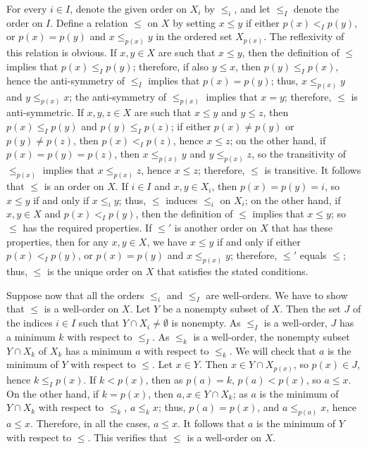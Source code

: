 \documentclass{article}
\begin{document}
\begin{solution}[\ref{exe:rw9lhmv9}]
  \label{sol:dcd6z7iz}
  For every \(i \in I\), denote the given order on \(X_i\) by
  \(\leq_i\), and let \(\leq_I\) denote the order on \(I\).  Define a
  relation \(\leq\) on \(X\) by setting \(x \leq y\) if either
  \(p(x) <_I p(y)\), or \(p(x) = p(y)\) and \(x \leq_{p(x)} y\) in the
  ordered set \(X_{p(x)}\).  The reflexivity of this relation is
  obvious.  If \(x, y \in X\) are such that \(x \leq y\), then the
  definition of \(\leq\) implies that \(p(x) \leq_I p(y)\); therefore,
  if also \(y \leq x\), then \(p(y) \leq_I p(x)\), hence the
  anti-symmetry of \(\leq_I\) implies that \(p(x) = p(y)\); thus,
  \(x \leq_{p(x)} y\) and \(y \leq_{p(x)} x\); the anti-symmetry of
  \(\leq_{p(x)}\) implies that \(x = y\); therefore, \(\leq\) is
  anti-symmetric.  If \(x, y, z \in X\) are such that \(x \leq y\) and
  \(y \leq z\), then \(p(x) \leq_I p(y)\) and \(p(y) \leq_I p(z)\); if
  either \(p(x) \neq p(y)\) or \(p(y) \neq p(z)\), then
  \(p(x) <_I p(z)\), hence \(x \leq z\); on the other hand, if
  \(p(x) = p(y) = p(z)\), then \(x \leq_{p(x)} y\) and
  \(y \leq_{p(x)} z\), so the transitivity of \(\leq_{p(x)}\) implies
  that \(x \leq_{p(x)} z\), hence \(x \leq z\); therefore, \(\leq\) is
  transitive.  It follows that \(\leq\) is an order on \(X\).  If
  \(i \in I\) and \(x, y \in X_i\), then \(p(x) = p(y) = i\), so
  \(x \leq y\) if and only if \(x \leq_i y\); thus, \(\leq\) induces
  \(\leq_i\) on \(X_i\); on the other hand, if \(x, y \in X\) and
  \(p(x) <_I p(y)\), then the definition of \(\leq\) implies that
  \(x \leq y\); so \(\leq\) has the required properties.  If \(\leq'\)
  is another order on \(X\) that has these properties, then for any
  \(x, y \in X\), we have \(x \leq y\) if and only if either
  \(p(x) <_I p(y)\), or \(p(x) = p(y)\) and \(x \leq_{p(x)} y\);
  therefore, \(\leq'\) equals \(\leq\); thus, \(\leq\) is the unique
  order on \(X\) that satisfies the stated conditions.

  Suppose now that all the orders \(\leq_i\) and \(\leq_I\) are
  well-orders.  We have to show that \(\leq\) is a well-order on
  \(X\).  Let \(Y\) be a nonempty subset of \(X\).  Then the set \(J\)
  of the indices \(i \in I\) such that \(Y \cap X_i \neq \emptyset\)
  is nonempty.  As \(\leq_I\) is a well-order, \(J\) has a minimum
  \(k\) with respect to \(\leq_I\).  As \(\leq_k\) is a well-order,
  the nonempty subset \(Y \cap X_k\) of \(X_k\) has a minimum \(a\)
  with respect to \(\leq_k\).  We will check that \(a\) is the minimum
  of \(Y\) with respect to \(\leq\).  Let \(x \in Y\).  Then
  \(x \in Y \cap X_{p(x)}\), so \(p(x) \in J\), hence
  \(k \leq_I p(x)\).  If \(k < p(x)\), then as \(p(a) = k\), \(p(a) <
  p(x)\), so \(a \leq x\).  On the other hand, if \(k = p(x)\), then
  \(a, x \in Y \cap X_k\); as \(a\) is the minimum of \(Y \cap X_k\)
  with respect to \(\leq_k\), \(a \leq_k x\); thus, \(p(a) = p(x)\),
  and \(a \leq_{p(a)} x\), hence \(a \leq x\).  Therefore, in all the
  cases, \(a \leq x\).  It follows that \(a\) is the minimum of \(Y\)
  with respect to \(\leq\).  This verifies that \(\leq\) is a
  well-order on \(X\).
\end{solution}
\end{document}

